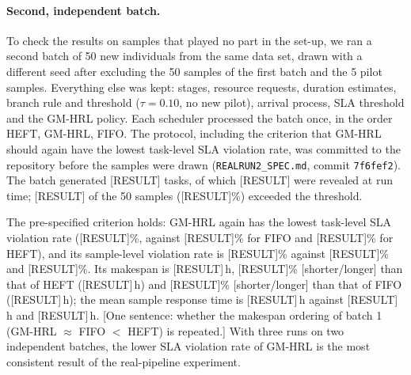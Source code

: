 

\paragraph{Second, independent batch.}
To check the results on samples that played no part in the set-up, we ran a second batch of 50 new individuals from the same data set, drawn with a different seed after excluding the 50 samples of the first batch and the 5 pilot samples. Everything else was kept: stages, resource requests, duration estimates, branch rule and threshold ($\tau = 0.10$, no new pilot), arrival process, SLA threshold and the GM-HRL policy. Each scheduler processed the batch once, in the order HEFT, GM-HRL, FIFO. The protocol, including the criterion that GM-HRL should again have the lowest task-level SLA violation rate, was committed to the repository before the samples were drawn (\texttt{REALRUN2\_SPEC.md}, commit \texttt{7f6fef2}). The batch generated [RESULT] tasks, of which [RESULT] were revealed at run time; [RESULT] of the 50 samples ([RESULT]\%) exceeded the threshold.

The pre-specified criterion holds: GM-HRL again has the lowest task-level SLA violation rate ([RESULT]\%, against [RESULT]\% for FIFO and [RESULT]\% for HEFT), and its sample-level violation rate is [RESULT]\% against [RESULT]\% and [RESULT]\%. Its makespan is [RESULT]\,h, [RESULT]\% [shorter/longer] than that of HEFT ([RESULT]\,h) and [RESULT]\% [shorter/longer] than that of FIFO ([RESULT]\,h); the mean sample response time is [RESULT]\,h against [RESULT]\,h and [RESULT]\,h. [One sentence: whether the makespan ordering of batch 1 (GM-HRL $\approx$ FIFO $<$ HEFT) is repeated.] With three runs on two independent batches, the lower SLA violation rate of GM-HRL is the most consistent result of the real-pipeline experiment.

